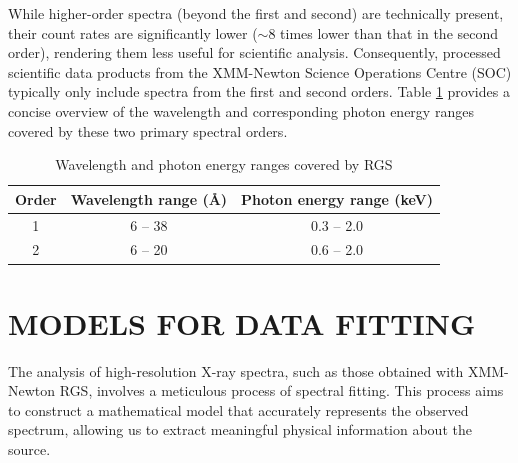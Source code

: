 			While higher-order spectra (beyond the first and second) are technically present, their count rates are significantly lower ($\sim 8$ times lower than that in the second order), rendering them less useful for scientific analysis. Consequently, processed scientific data products from the XMM-Newton Science Operations Centre (SOC) typically only include spectra from the first and second orders. Table \ref{xmm-rgs-wavelength} provides a concise overview of the wavelength and corresponding photon energy ranges covered by these two primary spectral orders.
			\begin{table}[!htb]
				\centering
				\caption{Wavelength and photon energy ranges covered by RGS}
				\label{xmm-rgs-wavelength}
				\begin{tabular}{ccc}
					\hline
					{\textbf{Order}} & {\textbf{Wavelength range (\AA)}} & {\textbf{Photon energy range (keV)}} \\
					\hline
					{1} & {6 -- 38} & {0.3 -- 2.0} \\
					{2} & {6 -- 20} & {0.6 -- 2.0} \\
					\hline
				\end{tabular}
			\end{table}
	
	\section{\MakeUppercase{Models for Data Fitting}} \label{hi-resolution:models}
		The analysis of high-resolution X-ray spectra, such as those obtained with XMM-Newton RGS, involves a meticulous process of spectral fitting. This process aims to construct a mathematical model that accurately represents the observed spectrum, allowing us to extract meaningful physical information about the source.
		
